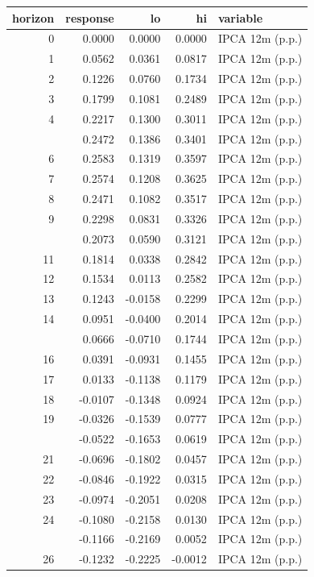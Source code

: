 
\begin{tabular}{rrrrl}
\toprule
horizon & response & lo & hi & variable\\
\midrule
0 & 0.0000 & 0.0000 & 0.0000 & IPCA 12m (p.p.)\\
1 & 0.0562 & 0.0361 & 0.0817 & IPCA 12m (p.p.)\\
2 & 0.1226 & 0.0760 & 0.1734 & IPCA 12m (p.p.)\\
3 & 0.1799 & 0.1081 & 0.2489 & IPCA 12m (p.p.)\\
4 & 0.2217 & 0.1300 & 0.3011 & IPCA 12m (p.p.)\\
\addlinespace
5 & 0.2472 & 0.1386 & 0.3401 & IPCA 12m (p.p.)\\
6 & 0.2583 & 0.1319 & 0.3597 & IPCA 12m (p.p.)\\
7 & 0.2574 & 0.1208 & 0.3625 & IPCA 12m (p.p.)\\
8 & 0.2471 & 0.1082 & 0.3517 & IPCA 12m (p.p.)\\
9 & 0.2298 & 0.0831 & 0.3326 & IPCA 12m (p.p.)\\
\addlinespace
10 & 0.2073 & 0.0590 & 0.3121 & IPCA 12m (p.p.)\\
11 & 0.1814 & 0.0338 & 0.2842 & IPCA 12m (p.p.)\\
12 & 0.1534 & 0.0113 & 0.2582 & IPCA 12m (p.p.)\\
13 & 0.1243 & -0.0158 & 0.2299 & IPCA 12m (p.p.)\\
14 & 0.0951 & -0.0400 & 0.2014 & IPCA 12m (p.p.)\\
\addlinespace
15 & 0.0666 & -0.0710 & 0.1744 & IPCA 12m (p.p.)\\
16 & 0.0391 & -0.0931 & 0.1455 & IPCA 12m (p.p.)\\
17 & 0.0133 & -0.1138 & 0.1179 & IPCA 12m (p.p.)\\
18 & -0.0107 & -0.1348 & 0.0924 & IPCA 12m (p.p.)\\
19 & -0.0326 & -0.1539 & 0.0777 & IPCA 12m (p.p.)\\
\addlinespace
20 & -0.0522 & -0.1653 & 0.0619 & IPCA 12m (p.p.)\\
21 & -0.0696 & -0.1802 & 0.0457 & IPCA 12m (p.p.)\\
22 & -0.0846 & -0.1922 & 0.0315 & IPCA 12m (p.p.)\\
23 & -0.0974 & -0.2051 & 0.0208 & IPCA 12m (p.p.)\\
24 & -0.1080 & -0.2158 & 0.0130 & IPCA 12m (p.p.)\\
\addlinespace
25 & -0.1166 & -0.2169 & 0.0052 & IPCA 12m (p.p.)\\
26 & -0.1232 & -0.2225 & -0.0012 & IPCA 12m (p.p.)\\

\end{tabular}
